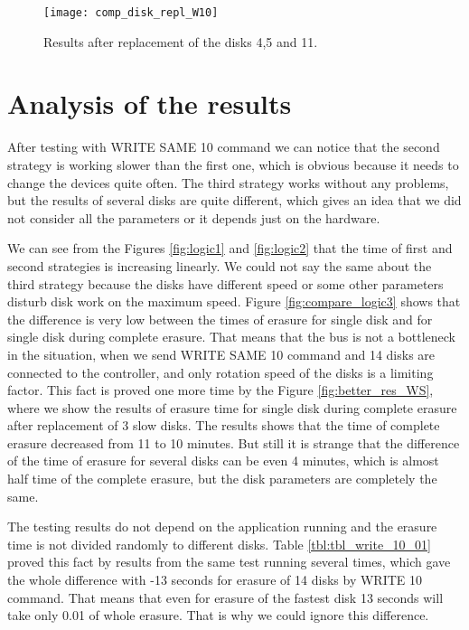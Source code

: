 \begin{figure}[h!]
\begin{center}
  \texttt{[image: comp\_disk\_repl\_W10]}
\end{center}
  \caption{Results after replacement of the disks 4,5 and 11.}
  \label{fig:comp_disk_repl_W10}
\end{figure}



\newpage
\section{Analysis of the results}

After testing with WRITE SAME 10 command we can notice that the second strategy is working slower than the first one, which is obvious because it needs to change the devices quite often. The third strategy works without any problems, but the results of several disks are quite different, which gives an idea that we did not consider all the parameters or it depends just on the hardware.

We can see from the Figures \ref{fig:logic1} and \ref{fig:logic2} that the time of first and second strategies is increasing linearly. We could not say the same about the third strategy because the disks have different speed or some other parameters disturb disk work on the maximum speed. Figure \ref{fig:compare_logic3} shows that the difference is very low between the times of erasure for single disk and for single disk during complete erasure. That means that the bus is not a bottleneck in the situation, when we send WRITE SAME 10 command and 14 disks are connected to the controller, and only rotation speed of the disks is a limiting factor. This fact is proved one more time by the Figure \ref{fig:better_res_WS}, where we show the results of erasure time for single disk during complete erasure after replacement of 3 slow disks. The results shows that the time of complete erasure decreased from 11 to 10 minutes. But still it is strange that the difference of the time of erasure for several disks can be even 4 minutes, which is almost half time of the complete erasure, but the disk parameters are completely the same.

The testing results do not depend on the application running and the erasure time is not divided randomly to different disks. Table \ref{tbl:tbl_write_10_01} proved this fact by results from the same test running several times, which gave the whole difference with -13 seconds for erasure of 14 disks by WRITE 10 command. That means that even for erasure of the fastest disk 13 seconds will take only 0.01 of whole erasure. That is why we could ignore this difference. 

